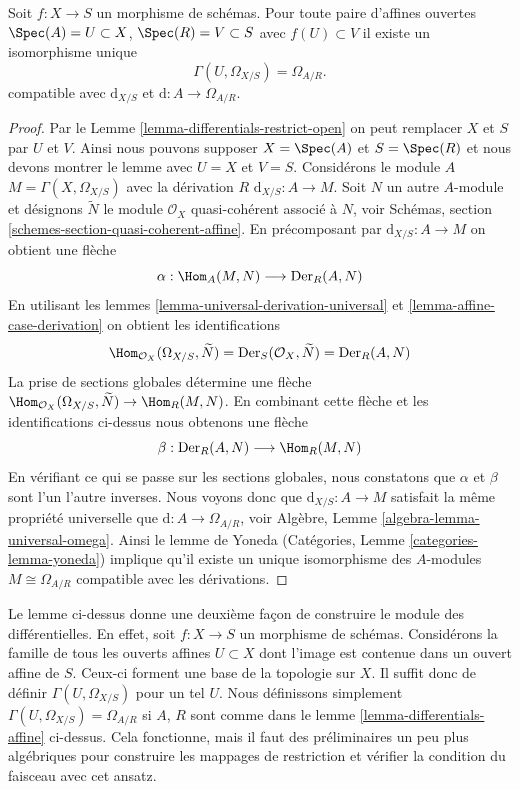 \begin{lemma}
\label{lemma-differentials-affine}
Soit $f : X \to S$ un morphisme de schémas. Pour toute paire d'affines
ouvertes $\Spec(A) = U \subset X$, $\Spec(R) = V \subset S$ avec $f(U) \subset V$ il existe
un isomorphisme unique
$$
\Gamma(U, \Omega_{X/S}) = \Omega_{A/R}.
$$
compatible avec $\text{d}_{X/S}$ et $\text{d} : A \to \Omega_{A/R}$.
\end{lemma}

\begin{proof}
Par le Lemme \ref{lemma-differentials-restrict-open} on peut remplacer $X$ et $S$
par $U$ et $V$. Ainsi nous pouvons supposer
$X = \Spec(A)$ et $S = \Spec(R)$ et nous devons montrer le
lemme avec $U = X$ et $V = S$. Considérons le module
$A$ $M = \Gamma(X, \Omega_{X/S})$ avec la dérivation $R$ $\text{d}_{X/S} : A \to M$.
Soit $N$ un autre $A$-module et désignons $\widetilde{N}$
le module $\mathcal{O}_X$ quasi-cohérent
associé à $N$, voir Schémas, section \ref{schemes-section-quasi-coherent-affine}.
En précomposant par $\text{d}_{X/S} : A \to M$ on obtient une flèche
$$
\alpha : \Hom_A(M, N) \longrightarrow \text{Der}_R(A, N)
$$
En utilisant les lemmes \ref{lemma-universal-derivation-universal} et \ref{lemma-affine-case-derivation}
on obtient les identifications
$$
\Hom_{\mathcal{O}_X}(\Omega_{X/S}, \widetilde{N}) =
\text{Der}_S(\mathcal{O}_X, \widetilde{N}) =
\text{Der}_R(A, N)
$$
La prise de sections globales détermine
une flèche $\Hom_{\mathcal{O}_X}(\Omega_{X/S}, \widetilde{N}) \to \Hom_R(M, N)$. En combinant cette flèche et les
identifications ci-dessus nous obtenons une flèche
$$
\beta : \text{Der}_R(A, N) \longrightarrow \Hom_R(M, N)
$$
En vérifiant ce qui se passe sur les sections globales, nous
constatons que $\alpha$ et $\beta$ sont l'un
l'autre inverses. Nous voyons donc
que $\text{d}_{X/S} : A \to M$ satisfait la même propriété universelle que
$\text{d} : A \to \Omega_{A/R}$, voir Algèbre, Lemme \ref{algebra-lemma-universal-omega}. Ainsi le lemme de Yoneda (Catégories,
Lemme \ref{categories-lemma-yoneda}) implique qu'il existe
un unique isomorphisme des $A$-modules
$M \cong \Omega_{A/R}$ compatible avec les dérivations.
\end{proof}

\begin{remark}
\label{remark-differentials-glue}
Le lemme ci-dessus donne une deuxième façon de construire le module des
différentielles. En effet, soit $f : X \to S$ un morphisme de schémas. Considérons
la famille de tous les ouverts affines $U \subset X$ dont l'image est contenue
dans un ouvert affine de $S$. Ceux-ci forment une base
de la topologie sur $X$. Il suffit donc de définir $\Gamma(U, \Omega_{X/S})$
pour un tel $U$. Nous définissons simplement $\Gamma(U, \Omega_{X/S}) = \Omega_{A/R}$ si $A$,
$R$ sont comme dans le lemme \ref{lemma-differentials-affine} ci-dessus. Cela fonctionne,
mais il faut des préliminaires un peu plus algébriques pour
construire les mappages de restriction et vérifier la condition
du faisceau avec cet ansatz.
\end{remark}

